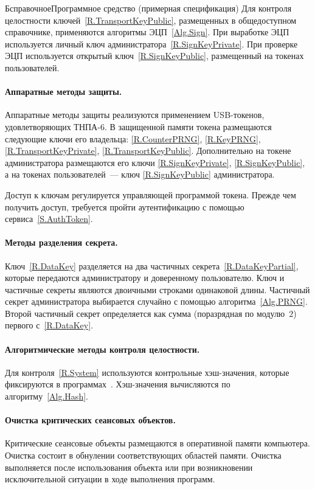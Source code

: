 \begin{appendix}{Б}{справочное}{Программное средство \CryptoDisk 
(примерная спецификация)}
Для контроля целостности ключей~\ref{R.TransportKeyPublic},
размещенных в общедоступном справочнике,
применяются алгоритмы ЭЦП~\ref{Alg.Sign}.
При выработке ЭЦП используется личный ключ администратора~\ref{R.SignKeyPrivate}. 
При проверке ЭЦП используется открытый ключ~\ref{R.SignKeyPublic},
размещенный на токенах пользователей.

\paragraph*{Аппаратные методы защиты.}
Аппаратные методы защиты реализуются применением USB-токенов,
удовлетворяющих ТНПА-6.
В защищенной памяти токена размещаются следующие ключи его владельца:
\ref{R.CounterPRNG}, \ref{R.KeyPRNG}, \ref{R.TransportKeyPrivate}, 
\ref{R.TransportKeyPublic}.
Дополнительно на токене администратора размещаются его ключи 
\ref{R.SignKeyPrivate}, \ref{R.SignKeyPublic}, 
а на токенах пользователей~--- ключ \ref{R.SignKeyPublic} администратора.

Доступ к ключам регулируется управляющей программой токена.
Прежде чем получить доступ, требуется пройти аутентификацию
с помощью сервиса~\ref{S.AuthToken}.

\paragraph*{Методы разделения секрета.}
Ключ~\ref{R.DataKey} разделяется на два частичных секрета~\ref{R.DataKeyPartial},
которые передаются администратору и доверенному пользователю.
Ключ и частичные секреты являются двоичными строками одинаковой длины.
Частичный секрет администратора выбирается случайно с помощью алгоритма~\ref{Alg.PRNG}.
Второй частичный секрет определяется как сумма (поразрядная по модулю~$2$)
первого с~\ref{R.DataKey}.

\paragraph*{Алгоритмические методы контроля целостности.}
Для контроля~\ref{R.System} используются контрольные хэш-значения,
которые фиксируются в программах~\CryptoDisk.
Хэш-значения вычисляются по алгоритму~\ref{Alg.Hash}.

\paragraph*{Очистка критических сеансовых объектов.}
Критические сеансовые объекты размещаются в оперативной памяти компьютера.
Очистка состоит в обнулении соответствующих областей памяти.
Очистка выполняется после использования объекта или 
при возникновении исключительной ситуации в ходе выполнения программ.


\end{appendix}
